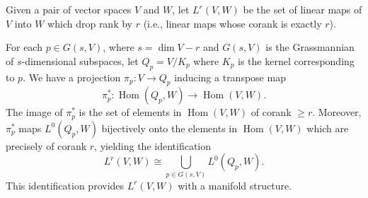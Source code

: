 Given a pair of vector spaces $V$ and $W$, let $L^r(V, W)$ be the set of linear maps of $V$ into $W$ which drop rank by $r$ (i.e., linear maps whose corank is exactly $r$).

For each $p \in G(s, V)$, where $s = \dim V - r$ and $G(s, V)$ is the Grassmannian of $s$-dimensional subspaces, let $Q_p = V / K_p$ where $K_p$ is the kernel corresponding to $p$. We have a projection $\pi_p: V \to Q_p$ inducing a transpose map
$$\pi_p^*: \operatorname{Hom}(Q_p, W) \to \operatorname{Hom}(V, W).$$
The image of $\pi_p^*$ is the set of elements in $\operatorname{Hom}(V, W)$ of corank $\geq r$. Moreover, $\pi_p^*$ maps $L^0(Q_p, W)$ bijectively onto the elements in $\operatorname{Hom}(V, W)$ which are precisely of corank $r$, yielding the identification
$$L^r(V, W) \cong \bigcup_{p \in G(s, V)} L^0(Q_p, W).$$
This identification provides $L^r(V, W)$ with a manifold structure.
